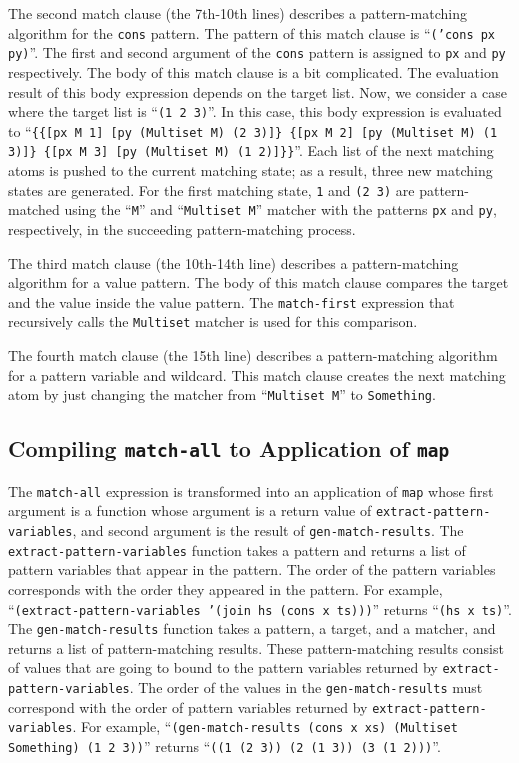 \documentclass[acmlarge]{acmart}
\begin{document}
The second match clause (the 7th-10th lines) describes a pattern-matching algorithm for the \texttt{cons} pattern.
The pattern of this match clause is  ``\texttt{('cons px py)}''.
The first and second argument of the \texttt{cons} pattern is assigned to \texttt{px} and \texttt{py} respectively.
The body of this match clause is a bit complicated.
The evaluation result of this body expression depends on the target list.
Now, we consider a case where the target list is ``\texttt{(1 2 3)}''.
In this case, this body expression is evaluated to ``\texttt{\{\{[px M 1] [py (Multiset M) (2 3)]\} \{[px M 2] [py (Multiset M) (1 3)]\} \{[px M 3] [py (Multiset M) (1 2)]\}\}}''.
Each list of the next matching atoms is pushed to the current matching state; as a result, three new matching states are generated.
For the first matching state, \texttt{1} and \texttt{(2 3)} are pattern-matched using the ``\texttt{M}'' and ``\texttt{Multiset M}'' matcher with the patterns \texttt{px} and \texttt{py}, respectively, in the succeeding pattern-matching process.

The third match clause (the 10th-14th line) describes a pattern-matching algorithm for a value pattern.
The body of this match clause compares the target and the value inside the value pattern.
The \texttt{match-first} expression that recursively calls the \texttt{Multiset} matcher is used for this comparison.

The fourth match clause (the 15th line) describes a pattern-matching algorithm for a pattern variable and wildcard.
This match clause creates the next matching atom by just changing the matcher from ``\texttt{Multiset M}'' to \texttt{Something}.

\subsection{Compiling \texttt{match-all} to Application of \texttt{map}}\label{method-map}

The \texttt{match-all} expression is transformed into an application of \texttt{map} whose first argument is a function whose argument is a return value of \texttt{extract-pattern-variables}, and second argument is the result of \texttt{gen-match-results}.
The \texttt{extract-pattern-variables} function takes a pattern and returns a list of pattern variables that appear in the pattern.
The order of the pattern variables corresponds with the order they appeared in the pattern.
For example, ``\texttt{(extract-pattern-variables '(join hs (cons x ts)))}'' returns ``\texttt{(hs x ts)}''.
The \texttt{gen-match-results} function takes a pattern, a target, and a matcher, and returns a list of pattern-matching results.
These pattern-matching results consist of values that are going to bound to the pattern variables returned by \texttt{extract-pattern-variables}.
The order of the values in the \texttt{gen-match-results} must correspond with the order of pattern variables returned by \texttt{extract-pattern-variables}.
For example, ``\texttt{(gen-match-results (cons x xs) (Multiset Something) (1 2 3))}'' returns ``\texttt{((1 (2 3)) (2 (1 3)) (3 (1 2)))}''.
\end{document}
